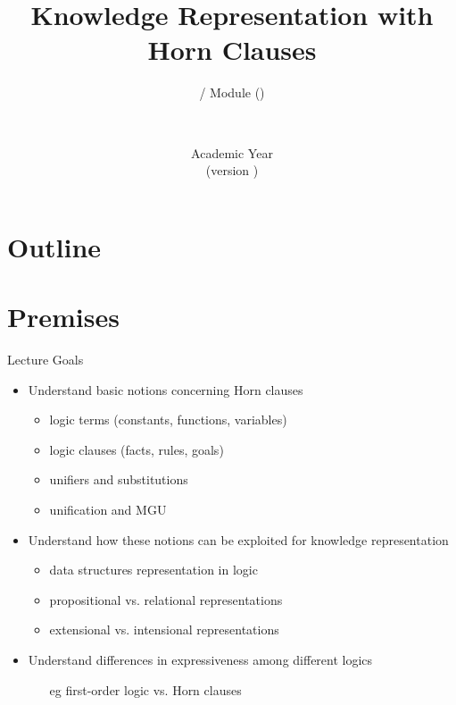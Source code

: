 \documentclass[presentation]{beamer}\mode<presentation>{\usetheme{AMSBolognaFC}}
\title[\currentLab{} -- Knowledge Representation]{Knowledge Representation with Horn Clauses}
\subtitle{\courseName{} / Module \moduleN{} (\courseAcronym)}
\author[\sspeaker{\gcShort}]{\speaker{\gcFull} \\ \gcEmail}
\institute[\disiShort, \uniboShort]{\disi{} (\disiShort)\\\unibo}
\date[A.Y. \academicYearShort{} (v.\ \version)]{Academic Year \academicYear{}\\(version \version)}
\begin{document}

\frame{\titlepage}

\section*{Outline}
%
\frame[c]{\tableofcontents[hideallsubsections]}

\section{Premises}

\begin{frame}{Lecture Goals}
    \begin{itemize}
        \item Understand basic notions concerning \alert{Horn clauses}
        \begin{itemize}
            \item logic terms (constants, functions, variables)
            \item logic clauses (facts, rules, goals)
            \item unifiers and substitutions
            \item unification and MGU
        \end{itemize}

        \vfill

        \item Understand how these notions can be exploited for \alert{knowledge representation}
        \begin{itemize}
            \item data structures representation in logic
            \item propositional vs. relational representations
            \item extensional vs. intensional representations
        \end{itemize}

        \vfill

        \item Understand differences in expressiveness among different logics
        \begin{itemize}
            \item[eg] first-order logic vs. Horn clauses
        \end{itemize}
    \end{itemize}
\end{frame}
\end{document}
